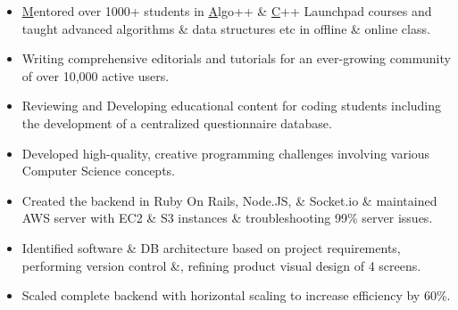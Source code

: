 \documentclass[10pt,a4paper,ragged2e]{altacv}
\begin{document}
\divider

\begin{itemize}
\item \color{blue}\href{https://codingblocks.com/team.html}Mentored   \color{black}over 1000+ students in \color{blue}\href{https://online.codingblocks.com/courses/data-structures-and-algorithms-online-course}Algo++ \color{black}\& \color{blue}\href{https://online.codingblocks.com/courses/c-plus-plus-online-course-for-beginners}C++ Launchpad \color{black}courses and taught advanced algorithms \& data structures etc in offline \& online class.

\item Writing comprehensive editorials and tutorials for an ever-growing
community of over 10,000 active users.
\end{itemize}

\divider

\begin{itemize}
    \item Reviewing and Developing educational content for coding students including the development of a centralized questionnaire database.
    
    \item Developed high-quality, creative programming challenges involving various Computer Science concepts.
\end{itemize}

\divider

\begin{itemize}
    \item Created the backend in Ruby On Rails, Node.JS, \& Socket.io \& maintained AWS server with EC2 \& S3 instances \& troubleshooting 99\% server issues.
    
    \item Identified software \& DB architecture based on project requirements, performing version control \&, refining product visual design of 4 screens.
    
    \item Scaled complete backend with horizontal scaling to increase efficiency by 60\%.
\end{itemize}
\end{document}
